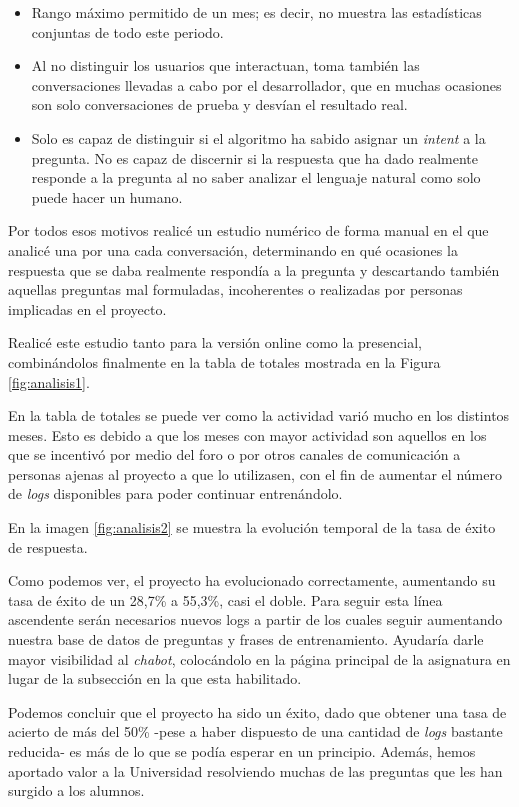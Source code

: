 \begin{itemize}
	\tightlist
	\item
	Rango máximo permitido de un mes; es decir, no muestra las estadísticas conjuntas de todo este periodo.
	\item 
	Al no distinguir los usuarios que interactuan, toma también las conversaciones llevadas a cabo por el desarrollador, que en muchas ocasiones son solo conversaciones de prueba y desvían el resultado real.
	\item 
	Solo es capaz de distinguir si el algoritmo ha sabido asignar un \textit{intent} a la pregunta. No es capaz de discernir si la respuesta que ha dado realmente responde a la pregunta al no saber analizar el lenguaje natural como solo puede hacer un humano.
\end{itemize}



\newpage


Por todos esos motivos realicé un estudio numérico de forma manual en el que analicé una por una cada conversación, determinando en qué ocasiones la respuesta que se daba realmente respondía a la pregunta y descartando también aquellas preguntas mal formuladas, incoherentes o realizadas por personas implicadas en el proyecto.

Realicé este estudio tanto para la versión online como la presencial, combinándolos finalmente en la tabla de totales mostrada en la Figura \ref{fig:analisis1}.


En la tabla de totales se puede ver como la actividad varió mucho en los distintos meses. Esto es debido a que los meses con mayor actividad son aquellos en los que se incentivó por medio del foro o por otros canales de comunicación  a personas ajenas al proyecto a que lo utilizasen, con el fin de aumentar el número de \textit{logs} disponibles para poder continuar entrenándolo.

En la imagen \ref{fig:analisis2} se muestra la evolución temporal de la tasa de éxito de respuesta.


Como podemos ver, el proyecto ha evolucionado correctamente, aumentando su tasa de éxito de un 28,7\% a 55,3\%, casi el doble. Para seguir esta línea ascendente serán necesarios nuevos logs a partir de los cuales seguir aumentando nuestra base de datos de preguntas y frases de entrenamiento. Ayudaría darle mayor visibilidad al \textit{chabot}, colocándolo en la página principal de la asignatura en lugar de la subsección en la que esta habilitado.

Podemos concluir que el proyecto ha sido un éxito, dado que obtener una tasa de acierto de más del 50\% -pese a haber dispuesto de una cantidad de \textit{logs} bastante reducida- es más de lo que se podía esperar en un principio.
Además, hemos aportado valor a la Universidad resolviendo muchas de las preguntas que les han surgido a los alumnos.